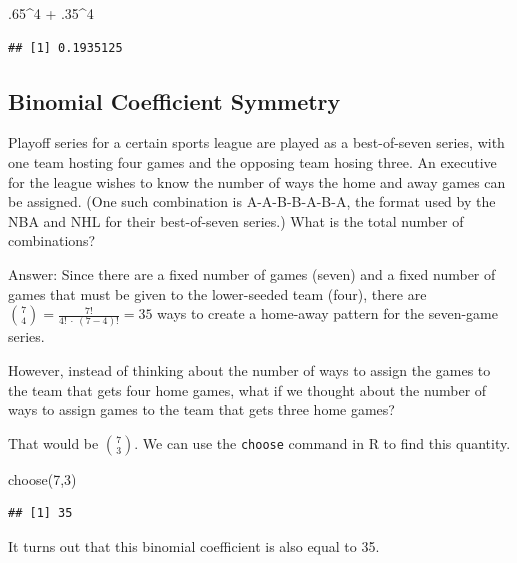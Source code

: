 \documentclass[
]{book}
\newenvironment{Shaded}{\begin{snugshade}}{\end{snugshade}}
\newcommand{\DecValTok}[1]{\textcolor[rgb]{0.00,0.00,0.81}{#1}}
\newcommand{\FunctionTok}[1]{\textcolor[rgb]{0.00,0.00,0.00}{#1}}
\newcommand{\NormalTok}[1]{#1}
\newcommand{\SpecialCharTok}[1]{\textcolor[rgb]{0.00,0.00,0.00}{#1}}
\theoremstyle{definition}
\theoremstyle{definition}
\theoremstyle{definition}
\theoremstyle{definition}
\theoremstyle{remark}
\begin{document}
\begin{Shaded}
\begin{Highlighting}[]
\NormalTok{.}\DecValTok{65}\SpecialCharTok{\^{}}\DecValTok{4} \SpecialCharTok{+}\NormalTok{ .}\DecValTok{35}\SpecialCharTok{\^{}}\DecValTok{4}
\end{Highlighting}
\end{Shaded}

\begin{verbatim}
## [1] 0.1935125
\end{verbatim}

\hypertarget{binomial-coefficient-symmetry-1}{%
\subsection{Binomial Coefficient Symmetry}\label{binomial-coefficient-symmetry-1}}

Playoff series for a certain sports league are played as a best-of-seven series, with one team hosting four games and the opposing team hosing three. An executive for the league wishes to know the number of ways the home and away games can be assigned. (One such combination is A-A-B-B-A-B-A, the format used by the NBA and NHL for their best-of-seven series.) What is the total number of combinations?

Answer: Since there are a fixed number of games (seven) and a fixed number of games that must be given to the lower-seeded team (four), there are \(\binom{7}{4} = \frac{7!}{4!\ \cdot\ (7-4)!} = 35\) ways to create a home-away pattern for the seven-game series.

However, instead of thinking about the number of ways to assign the games to the team that gets four home games, what if we thought about the number of ways to assign games to the team that gets three home games?

That would be \(\binom{7}{3}\). We can use the \texttt{choose} command in R to find this quantity.

\begin{Shaded}
\begin{Highlighting}[]
\FunctionTok{choose}\NormalTok{(}\DecValTok{7}\NormalTok{,}\DecValTok{3}\NormalTok{)}
\end{Highlighting}
\end{Shaded}

\begin{verbatim}
## [1] 35
\end{verbatim}

It turns out that this binomial coefficient is also equal to 35.
\end{document}
